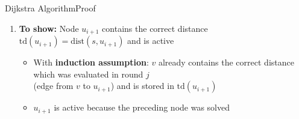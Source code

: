 
\begin{frame}{Dijkstra Algorithm}{Proof}
  \begin{figure}[!h]
    \begin{adjustbox}{width=0.9\linewidth}
      \def\DijkstraTD{1}%
      
    \end{adjustbox}
  \end{figure}
  \begin{enumerate}
    \item
      \textbf{To show:} Node {\color{MainA}$u_{i+1}$} contains the correct
      distance {\color{MainA}$\mathrm{td}(u_{i+1}) = \mathrm{dist}(s, u_{i+1})$}
      and is active
      \begin{itemize}
        \item
          With \textbf{induction assumption}:
          {\color{MainA}$v$} already contains the correct distance which
          was evaluated in round {\color{MainA}$j$}\\
          (edge from {\color{MainA}$v$} to {\color{MainA}$u_{i+1}$})
          and is stored in {\color{MainA}$\mathrm{td}(u_{i+1})$}
        \item
          {\color{MainA}$u_{i+1}$} is active because the preceding node
          was solved
      \end{itemize}
  \end{enumerate}
\end{frame}


